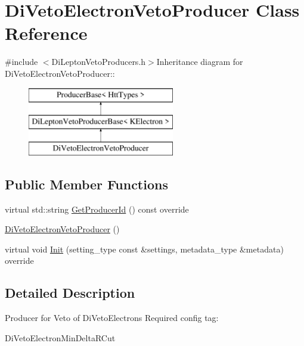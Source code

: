 \hypertarget{classDiVetoElectronVetoProducer}{
\section{DiVetoElectronVetoProducer Class Reference}
\label{classDiVetoElectronVetoProducer}
}


{\ttfamily \#include $<$DiLeptonVetoProducers.h$>$}Inheritance diagram for DiVetoElectronVetoProducer::\begin{figure}[H]
\begin{center}
\leavevmode
\includegraphics[height=3cm]{classDiVetoElectronVetoProducer}
\end{center}
\end{figure}
\subsection*{Public Member Functions}
\begin{DoxyCompactItemize}
\item 
virtual std::string \hyperlink{classDiVetoElectronVetoProducer_a26a4b0a9259f5272f8dc774a8cfbf12d}{GetProducerId} () const override
\item 
\hyperlink{classDiVetoElectronVetoProducer_adc3033ffcd412c0fad5051ad3e2c1b21}{DiVetoElectronVetoProducer} ()
\item 
virtual void \hyperlink{classDiVetoElectronVetoProducer_ac741e779b47951598f628b190d883eda}{Init} (setting\_\-type const \&settings, metadata\_\-type \&metadata) override
\end{DoxyCompactItemize}


\subsection{Detailed Description}
Producer for Veto of DiVetoElectrons Required config tag:
\begin{DoxyItemize}
\item DiVetoElectronMinDeltaRCut 
\end{DoxyItemize}

